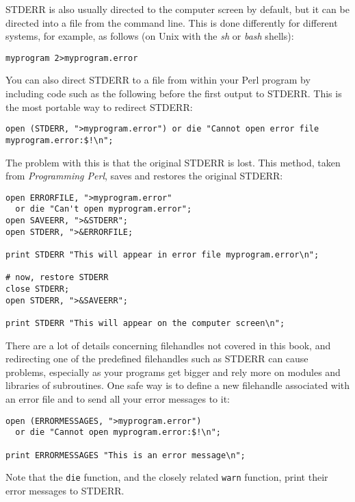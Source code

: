 STDERR is also usually directed to the computer screen by default, but it can be directed into a file from the command line. This is done differently for different systems, for example, as follows (on Unix with the \textit{sh} or \textit{bash} shells):

\begin{lstlisting}
myprogram 2>myprogram.error
\end{lstlisting}

You can also direct STDERR to a file from within your Perl program by including code such as the following before the first output to STDERR.  This is the most portable way to redirect STDERR:

\begin{lstlisting}
open (STDERR, ">myprogram.error") or die "Cannot open error file myprogram.error:$!\n";
\end{lstlisting}

The problem with this is that the original STDERR is lost. This method, taken from \textit{Programming Perl}, saves and restores the original STDERR:

\begin{lstlisting}
open ERRORFILE, ">myprogram.error" 
  or die "Can't open myprogram.error";
open SAVEERR, ">&STDERR";
open STDERR, ">&ERRORFILE;

print STDERR "This will appear in error file myprogram.error\n";

# now, restore STDERR 
close STDERR;
open STDERR, ">&SAVEERR";

print STDERR "This will appear on the computer screen\n";
\end{lstlisting}

There are a lot of details concerning filehandles not covered in this book, and redirecting one of the predefined filehandles such as STDERR can cause problems, especially as your programs get bigger and rely more on modules and libraries of subroutines. One safe way is to define a new filehandle associated with an error file and to send all your error messages to it:

\begin{lstlisting}
open (ERRORMESSAGES, ">myprogram.error") 
  or die "Cannot open myprogram.error:$!\n";

print ERRORMESSAGES "This is an error message\n";
\end{lstlisting}

Note that the \verb|die| function, and the closely related \verb|warn| function, print their error messages to STDERR. 

